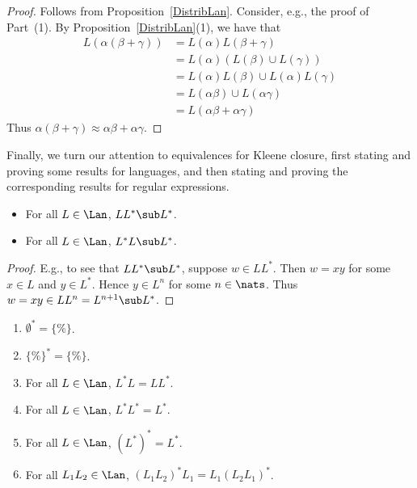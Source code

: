 \begin{proof}
Follows from Proposition~\ref{DistribLan}.  Consider, e.g., the proof
of Part~(1).  By Proposition~\ref{DistribLan}(1), we have that
\begin{align*}
L(\alpha(\beta+\gamma)) &= L(\alpha)L(\beta+\gamma) \\
&= L(\alpha)(L(\beta)\cup L(\gamma))  \\
&= L(\alpha)L(\beta)\cup L(\alpha)L(\gamma) \\
&= L(\alpha\beta)\cup L(\alpha\gamma) \\
&= L(\alpha\beta + \alpha\gamma)
\end{align*}
Thus $\alpha(\beta+\gamma)\approx \alpha\beta+\alpha\gamma$.
\end{proof}

Finally, we turn our attention to equivalences for Kleene closure,
%
first stating and proving some results for languages, and then stating
and proving the corresponding results for regular expressions.

\begin{proposition}
\label{ClosureInclusions}
\begin{itemize}
\item For all $L\in\Lan$, $LL^*\sub L^*$.

\item For all $L\in\Lan$, $L^*L\sub L^*$.
\end{itemize}
\end{proposition}

\begin{proof}
E.g., to see that $LL^*\sub L^*$, suppose $w\in LL^*$.
Then $w=xy$ for some $x\in L$ and $y\in L^*$.  Hence
$y\in L^n$ for some $n\in\nats$.  Thus $w=xy\in LL^n=L^{n+1}\sub L^*$.
\end{proof}

\begin{proposition}
\label{ClosureLan}
\begin{enumerate}[(1)]
\item $\emptyset^* = \{\%\}$.

\item $\{\%\}^* = \{\%\}$.

\item For all $L\in\Lan$, $L^*L = LL^*$.

\item For all $L\in\Lan$, $L^*L^* = L^*$.

\item For all $L\in\Lan$, $(L^*)^* = L^*$.

\item For all $L_1L_2\in\Lan$, $(L_1L_2)^*L_1 = L_1(L_2L_1)^*$.
\end{enumerate}
\end{proposition}

